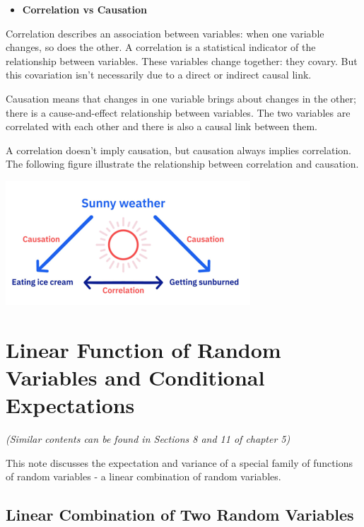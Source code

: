 \documentclass[
]{book}
\providecommand{\tightlist}{%
  \setlength{\itemsep}{0pt}\setlength{\parskip}{0pt}}
\begin{document}
\begin{itemize}
\tightlist
\item
  \textbf{Correlation vs Causation}
\end{itemize}

Correlation describes an association between variables: when one variable changes, so does the other. A correlation is a statistical indicator of the relationship between variables. These variables change together: they covary. But this covariation isn't necessarily due to a direct or indirect causal link.

Causation means that changes in one variable brings about changes in the other; there is a cause-and-effect relationship between variables. The two variables are correlated with each other and there is also a causal link between them.

A correlation doesn't imply causation, but causation always implies correlation. The following figure illustrate the relationship between correlation and causation.

\begin{center}\includegraphics[width=0.4\linewidth]{topic08/correlationCausation} \end{center}

\hfill\break

\hypertarget{linear-function-of-random-variables-and-conditional-expectations}{%
\chapter{Linear Function of Random Variables and Conditional Expectations}\label{linear-function-of-random-variables-and-conditional-expectations}}

\emph{(Similar contents can be found in Sections 8 and 11 of chapter 5)}

This note discusses the expectation and variance of a special family of functions of random variables - a linear combination of random variables.

\hfill\break

\hypertarget{linear-combination-of-two-random-variables}{%
\section{Linear Combination of Two Random Variables}\label{linear-combination-of-two-random-variables}}
\end{document}
